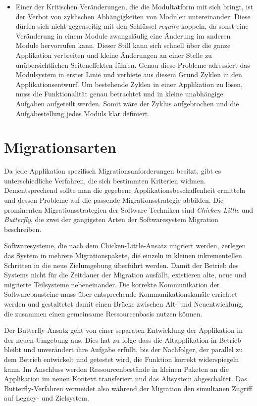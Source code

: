 \begin{itemize}
	\item Einer der Kritischen Veränderungen, die die Modultatform mit sich bringt, ist der Verbot von zyklischen Abhängigkeiten von Modulen untereinander. Diese dürfen sich nicht gegenseitig mit den Schlüssel \textit{require} koppeln, da sonst eine Veränderung in einem Module zwangsläufig eine Änderung im anderen Module hervorrufen kann. Dieser Still kann sich schnell über die ganze Applikation verbreiten und kleine Änderungen an einer Stelle zu unübersichtlichen Seiteneffekten führen. Genau diese Probleme adressiert das Modulsystem in erster Linie und verbiete aus diesem Grund Zyklen in den Applikationsentwurf. Um bestehende Zyklen in einer Applikation zu lösen, muss die Funktionalität genau betrachtet und in kleine unabhängige Aufgaben aufgeteilt werden. Somit wäre der Zyklus aufgebrochen und die Aufgabestellung jedes Moduls klar definiert. 
\end{itemize}

\section{Migrationsarten}
	Da jede Applikation spezifisch Migrationsanforderungen besitzt, gibt es unterschiedliche Verfahren, die sich bestimmten Kriterien widmen. Dementsprechend sollte man die gegebene Applikationsbeschaffenheit ermitteln und dessen Probleme auf die passende Migrationsstrategie abbilden. Die prominenten Migrationsstrategien der Software Techniken sind \textit{Chicken Little} und \textit{Butterfly}, die zwei der gängigsten Arten der Softwaresystem Migration beschreiben.\bigbreak


	Softwaresysteme, die nach dem Chicken-Little-Ansatz migriert werden, zerlegen das System in mehrere Migrationspakete, die einzeln in kleinen inkrementellen Schritten in die neue Zielumgebung überführt werden. Damit der Betrieb des Systems nicht für die Zeitdauer der Migration ausfällt, existieren alte, neue und migrierte Teilsysteme nebeneinander. Die korrekte Kommunikation der Softwarebausteine muss über entsprechende Kommunikationskanäle errichtet werden und gestaltetet damit einen Brücke zwischen Alt- und Neuentwicklung, die zusammen einen gemeinsame Ressourcenbasis nutzen können. \bigbreak

	Der Butterfly-Ansatz geht von einer separaten Entwicklung der Applikation in der neuen Umgebung aus. Dies hat zu folge dass die Altapplikation in Betrieb bleibt und unverändert ihre Aufgabe erfüllt, bis der Nachfolger, der parallel zu dem Betrieb entwickelt und getestet wird, die Funktion korrekt widerspiegeln kann. Im Anschluss werden Ressourcenbestände in kleinen Paketen an die Applikation im neuen Kontext transferiert und das Altsystem abgeschaltet. Das Butterfly-Verfahren vermeidet also während der Migration den simultanen Zugriff auf Legacy- und Zielsystem. \bigbreak

